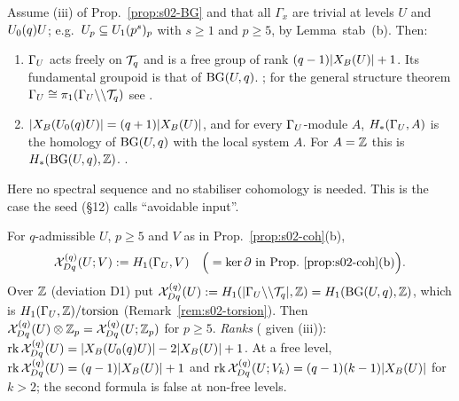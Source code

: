 \begin{proposition}\label{prop:s02-free}
Assume (iii) of Prop.~\ref{prop:s02-BG} and that all $\Gamma_x$ are trivial at levels $U$ and $U_0(q)U$;
e.g.\ $U_p\subseteq U_1(p^s)_p$ with $s\ge1$ and $p\ge5$, by Lemma~stab~(b). Then:
\begin{enumerate}[label=(\alph*)]
\item $\Gamma_U$ acts freely on $\mathcal{T}_q$ and is a free group of rank $(q-1)|X_B(U)|+1$. Its fundamental groupoid is
  that of $\mathrm{BG}(U,q)$.
  \stpmc{} ; for the
  general structure theorem $\Gamma_U\cong\pi_1(\Gamma_U\backslash\backslash\mathcal{T}_q)$ see .
\item $|X_B(U_0(q)U)|=(q+1)|X_B(U)|$, and for every $\Gamma_U$-module $A$, $H_*(\Gamma_U,A)$ is the homology of $\mathrm{BG}(U,q)$
  with the local system $A$. For $A=\mathbb{Z}$ this is $H_*(\mathrm{BG}(U,q),\mathbb{Z})$. \stproved.
\end{enumerate}
Here no spectral sequence and no stabiliser cohomology is needed. This is the case the seed (\S12) calls
``avoidable input''.
\end{proposition}

\begin{definition}\label{def:s02-indef}
For $q$-admissible $U$, $p\ge5$ and $V$ as in Prop.~\ref{prop:s02-coh}(b),
\[\cX^{(q)}_{Dq}(U;V):=H_1(\GU,V)\quad\Big(=\ker\partial\ \text{in Prop.~\ref{prop:s02-coh}(b)}\Big).\]
Over $\mathbb{Z}$ (deviation D1) put $\mathcal{X}^{(q)}_{Dq}(U):=H_1(|\Gamma_U\backslash\backslash\mathcal{T}_q|,\mathbb{Z})=H_1(\mathrm{BG}(U,q),\mathbb{Z})$, which is
$H_1(\Gamma_U,\mathbb{Z})/\mathrm{torsion}$ (Remark~\ref{rem:s02-torsion}). Then
$\mathcal{X}^{(q)}_{Dq}(U)\otimes\mathbb{Z}_p=\mathcal{X}^{(q)}_{Dq}(U;\mathbb{Z}_p)$ for $p\ge5$.
\emph{Ranks} (\stproved{} given (iii)):
$\operatorname{rk}\mathcal{X}^{(q)}_{Dq}(U)=|X_B(U_0(q)U)|-2|X_B(U)|+1$. At a free level, $\operatorname{rk}\mathcal{X}^{(q)}_{Dq}(U)=(q-1)|X_B(U)|+1$ and
$\operatorname{rk}\mathcal{X}^{(q)}_{Dq}(U;V_k)=(q-1)(k-1)|X_B(U)|$ for $k>2$; the second formula is false at non-free levels.
\end{definition}

